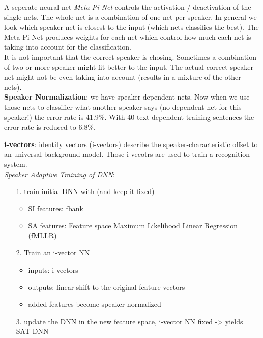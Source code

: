 A seperate neural net \textit{Meta-Pi-Net} controls the activation / deactivation of the single nets. The whole net is a combination of one net per speaker. In general we look which speaker net is closest to the input (which nets classifies the best). The Meta-Pi-Net produces weights for each net which control how much each net is taking into account for the classification.\\
It is not important that the correct speaker is chosing. Sometimes a combination of two or more speaker might fit better to the input. The actual correct speaker net might not be even taking into account (results in a mixture of the other nets).\\[1cm]

\textbf{Speaker Normalization}: we have speaker dependent nets. Now when we use those nets to classifier what another speaker says (no dependent net for this speaker!) the error rate is 41.9\%. With 40 text-dependent training sentences the error rate is reduced to 6.8\%.

\textbf{i-vectors}: identity vectors (i-vectors) describe the speaker-characteristic offset to an universal background model. Those i-vecotrs are used to train a recognition system.\\[1cm]

\textit{Speaker Adaptive Training of DNN}:
\begin{itemize}
	\item[1.] train initial DNN with (and keep it fixed)
		\begin{itemize}
			\item SI features: fbank
			\item SA features: Feature space Maximum Likelihood Linear Regression (fMLLR)
		\end{itemize} 
	\item[2.] Train an i-vector NN
		\begin{itemize}
			\item inputs: i-vectors
			\item outputs: linear shift to the original feature vectors
			\item added features become speaker-normalized
		\end{itemize}
	\item[3.] update the DNN in the new feature space, i-vector NN fixed -> yields SAT-DNN
\end{itemize}

